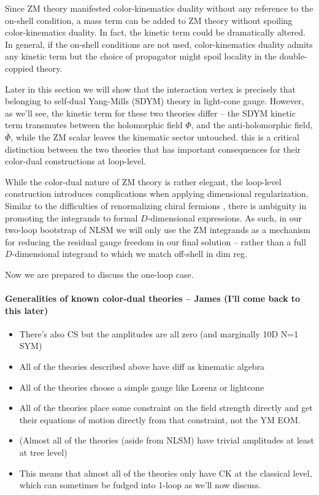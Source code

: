 \documentclass[11pt,letter]{article}
\begin{document}
Since ZM theory manifested color-kinematics duality without any reference to the on-shell condition, a mass term can be added to ZM theory without spoiling color-kinematics duality.
In fact, the kinetic term could be dramatically altered.
In general, if the on-shell conditions are not used, color-kinematics duality admits any kinetic term but the choice of propagator might spoil locality in the double-coppied theory.


Later in this section we will show that the interaction vertex is precisely that belonging to self-dual Yang-Mills (SDYM) theory in light-cone gauge. However, as we'll see, the kinetic term for these two theories differ -- the SDYM kinetic term transmutes between the holomorphic field $\Phi$, and the anti-holomorphic field, $\bar{\Phi}$, while the ZM scalar leaves the kinematic sector untouched. this is a critical distinction between the two theories that has important consequences for their color-dual constructions at loop-level.

While the color-dual nature of ZM theory is rather elegant, the loop-level construction introduces complications when applying dimensional regularization. Similar to the difficulties of renormalizing chiral fermions \cite{ 'tHooft}, there is ambiguity in promoting the integrands to formal $D$-dimensional expressions. As such, in our two-loop bootstrap of NLSM we will only use the ZM integrands as a mechanism for reducing the residual gauge freedom in our final solution -- rather than a full $D$-dimensional integrand to which we match off-shell in dim reg. 

Now we are prepared to discuss the one-loop case. 

\paragraph{Generalities of known color-dual theories -- James (I'll come back to this later)}
\begin{itemize}
\item There's also CS but the amplitudes are all zero (and marginally 10D N=1 SYM)
\item All of the theories described above have diff as kinematic algebra
\item All of the theories choose a simple gauge like Lorenz or lightcone
\item All of the theories place some constraint on the field strength directly and get their equations of motion directly from that constraint, not the YM EOM.
\item (Almost all of the theories (aside from NLSM) have trivial amplitudes at least at tree level)
\item This means that almost all of the theories only have CK at the classical level, which can sometimes be fudged into 1-loop as we'll now discuss.
\end{itemize}
\end{document}
